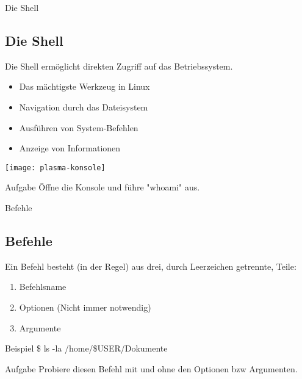 \begin{frame}{Die Shell}
    \subsection{Die Shell}\label{subsec:die-shell}
    \pause
    Die Shell ermöglicht direkten Zugriff auf das Betriebssystem.
    \pause

    \begin{itemize}
        \item Das mächtigste Werkzeug in Linux\pause
        \item Navigation durch das Dateisystem\pause
        \item Ausführen von System-Befehlen\pause
        \item Anzeige von Informationen
    \end{itemize}
    \pause

    \vspace{0.5cm}
    \texttt{[image: plasma-konsole]}
    \pause

    \vspace{0.5cm}
    \begin{alertblock}{Aufgabe}
        Öffne die Konsole und führe "whoami" aus.
    \end{alertblock}

\end{frame}

\begin{frame}{Befehle}
    \subsection{Befehle}\label{subsec:befehle}
    \pause
    Ein Befehl besteht (in der Regel) aus drei, durch Leerzeichen getrennte, Teile:
    \pause

    \begin{enumerate}
        \item Befehlsname\pause
        \item Optionen (Nicht immer notwendig)\pause
        \item Argumente
    \end{enumerate}
    \pause

    \vspace{0.5cm}
    \begin{exampleblock}{Beispiel}
        \$ \pause ls \pause -la \pause /home/\$USER/Dokumente
    \end{exampleblock}
    \pause

    \vspace{0.5cm}
    \begin{alertblock}{Aufgabe}
        Probiere diesen Befehl mit und ohne den Optionen bzw Argumenten.
    \end{alertblock}

\end{frame}

